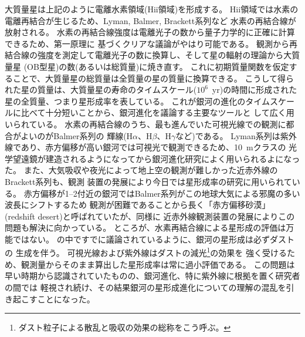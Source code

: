 大質量星は上記のように電離水素領域(H{\sc ii}領域)を形成する。
H{\sc ii}領域では水素の電離再結合が生じるため、Lyman, Balmer, Brackett系列など
水素の再結合線が放射される。
水素の再結合線強度は電離光子の数から量子力学的に正確に計算できるため、第一原理に
基づくクリアな議論がやはり可能である。
観測から再結合線の強度を測定して電離光子の数に換算し、そして星の輻射の理論から大質量星
(OB型星)の数(あるいは総質量)に焼き直す。
これに初期質量関数を仮定することで、大質量星の総質量は全質量の星の質量に換算できる。
こうして得られた星の質量は、大質量星の寿命のタイムスケール($10^6$~yr)の時間に形成された
星の全質量、つまり星形成率を表している\citep{kennicutt1983}。
これが銀河の進化のタイムスケールに比べて十分短いことから、銀河進化を議論する主要なツールと
して広く用いられている。
水素の再結合線のうち、最も進んでいた可視光線での観測に都合がよいのがBalmer系列の
輝線(H$\alpha$、H$\beta$、H$\gamma$など)である。
Lyman系列は紫外線であり、赤方偏移が高い銀河では可視光で観測できるため、10~mクラスの
光学望遠鏡が建造されるようになってから銀河進化研究によく用いられるよになった。
また、大気吸収や夜光によって地上空の観測が難しかった近赤外線のBrackett系列も、観測
装置の発展により今日では星形成率の研究に用いられている。
赤方偏移が1--2付近の銀河ではBalmer系列がこの地球大気による邪魔の多い波長にシフトするため
観測が困難であることから長く「赤方偏移砂漠」(redshift desert)と呼ばれていたが、同様に
近赤外線観測装置の発展によりこの問題も解決に向かっている。
ところが、水素再結合線による星形成の評価は万能ではない。
\citet{kennicutt1983}の中ですでに議論されているように、銀河の星形成は必ずダストの
生成を伴う。
可視光線および紫外線はダストの減光\footnote{ダスト粒子による散乱と吸収の効果の総称をこう呼ぶ。}の効果を
強く受けるため、観測量からそのまま算出した星形成率は常に過小評価である。
この問題は早い時期から認識されていたものの、銀河進化、特に紫外線に根拠を置く研究者の間では
軽視され続け、その結果銀河の星形成進化についての理解の混乱を引き起こすことになった。

